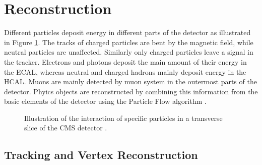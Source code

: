 \section{Reconstruction}
\label{sec:SimReco_Reco}

Different particles deposit energy in different parts of the detector as illustrated in Figure \ref{fig:pflow}.
The tracks of charged particles are bent by the magnetic field, while neutral particles are unaffected.
Similarly only charged particles leave a signal in the tracker.
Electrons and photons deposit the main amount of their energy in the ECAL, whereas neutral and charged hadrons mainly deposit energy in the HCAL.
Muons are mainly detected by muon system in the outermost parts of the detector.
Phyics objects are reconstructed by combining this information from the basic elements of the detector using the Particle Flow algorithm \cite{Sirunyan:2017ulk}.

\begin{figure}[htbp!]
  \begin{center}
\caption{Illustration of the interaction of specific particles in a transverse slice of the CMS detector \cite{Sirunyan:2017ulk}.
  \label{fig:pflow}}
  \end{center}
\end{figure}

\subsection{Tracking and Vertex Reconstruction}

